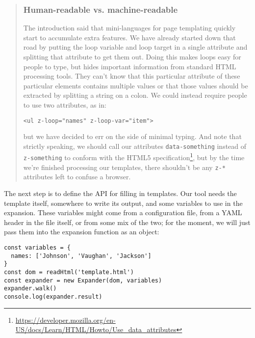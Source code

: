 \documentclass[krantzl]{krantz}
\newenvironment{callout}{\savenotes\begin{tBox}\begin{quotation}\toggletrue{inbox}\renewcommand{\thempfootnote}{\arabic{footnote}}}{\end{quotation}\vspace{\baselineskip}\end{tBox}\togglefalse{inbox}\spewnotes}
\newcommand{\hreffoot}[2]{{#1}\footnote{\href{#2}{#2}}}
\begin{document}
\begin{callout}


\subsubsection*{Human-readable vs. machine-readable}


The introduction said that mini-languages for page templating
quickly start to accumulate extra features.
We have already started down that road
by putting the loop variable and loop target in a single attribute
and splitting that attribute to get them out.
Doing this makes loops easy for people to type,
but hides important information from standard HTML processing tools.
They can’t know that this particular attribute of these particular elements
contains multiple values
or that those values should be extracted by splitting a string on a colon.
We could instead require people to use two attributes, as in:

\begin{lstlisting}[frame=tblr]
<ul z-loop="names" z-loop-var="item">
\end{lstlisting}


\noindent but we have decided to err on the side of minimal typing.
And note that strictly speaking,
we should call our attributes \texttt{data-something} instead of \texttt{z-something}
to conform with \hreffoot{the HTML5 specification}{https://developer.mozilla.org/en-US/docs/Learn/HTML/Howto/Use\_data\_attributes},
but by the time we’re finished processing our templates,
there shouldn’t be any \texttt{z-*} attributes left to confuse a browser.

\end{callout}


The next step is to define the API for filling in templates.
Our tool needs the template itself,
somewhere to write its output,
and some variables to use in the expansion.
These variables might come from a configuration file,
from a YAML header in the file itself,
or from some mix of the two;
for the moment,
we will just pass them into the expansion function as an object:


\begin{lstlisting}[frame=tblr]
const variables = {
  names: ['Johnson', 'Vaughan', 'Jackson']
}
const dom = readHtml('template.html')
const expander = new Expander(dom, variables)
expander.walk()
console.log(expander.result)
\end{lstlisting}
\end{document}
